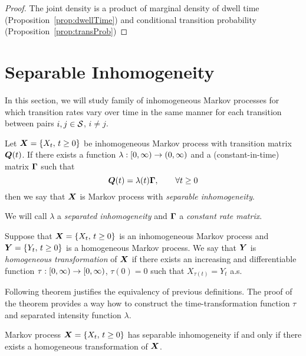 {\begin{proof}
	The joint density is a product of marginal density of dwell time (Proposition~\ref{prop:dwellTime}) and conditional transition probability (Proposition~\ref{prop:transProb})
\end{proof}



	
	
	




\section{Separable Inhomogeneity}
\label{chap:separable}

In this section, we will study family of inhomogeneous Markov processes for which transition rates vary over time in the same manner for each transition between pairs $i, j \in \S$, $i \neq j$.

\begin{definition}
	\label{def:separable}
	Let $\procX$ be inhomogeneous Markov process with transition matrix $\m{Q} (t)$. If there exists a function $\lambda: \Rplus \to (0, \infty)$ and a (constant-in-time) matrix $\m{\Gamma}$ such that
\[
	\m{Q}(t) = \lambda(t) \m{\Gamma}, \qquad \forall t \geq 0
\]
then we say that $\m{X}$ is Markov process with \emph{separable inhomogeneity}.

We will call $\lambda$ a \emph{separated inhomogeneity} and $\m{\Gamma}$ a \emph{constant rate matrix}.
\end{definition}

\begin{definition}
	\label{def:homoTrans}
	Suppose that $\procX$ is an inhomogeneous Markov process and $\m{Y} = \{Y_t, \, t \geq 0 \}$ is a homogeneous Markov process. We say that $\m{Y}$ is \emph{homogeneous transformation} of $\m{X}$ if there exists an increasing and differentiable function $\tau : \Rplus \to \Rplus$, $\tau (0) = 0$ such that $X_{\tau(t)} = Y_t$ a.s.
\end{definition}

Following theorem justifies the equivalency of previous definitions. The proof of the theorem provides a way how to construct the time-transformation function $\tau$ and separated intensity function $\lambda$.

\begin{proposition}
	\label{prop:separable}
	Markov process $\procX$ has separable inhomogeneity if and only if there exists a homogeneous transformation of $\m{X}$.
\end{proposition}

}
